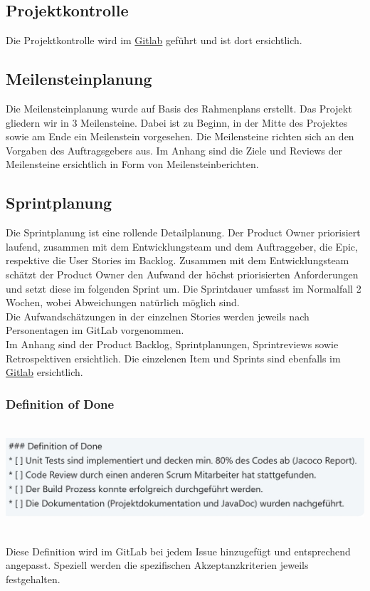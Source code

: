 \documentclass[11pt]{article}
\begin{document}
\subsection{Projektkontrolle}
Die Projektkontrolle wird im  \href{https://gitlab.enterpriselab.ch/vsk-20fs01/g04/g04-project/boards}{Gitlab} geführt und ist dort ersichtlich.

\subsection{Meilensteinplanung}
Die Meilensteinplanung wurde auf Basis des Rahmenplans erstellt. Das Projekt gliedern wir in 3 Meilensteine. Dabei ist zu Beginn, in der Mitte des Projektes sowie am Ende ein Meilenstein vorgesehen. Die Meilensteine richten sich an den Vorgaben des Auftragsgebers aus. Im Anhang sind die Ziele und Reviews der Meilensteine ersichtlich in Form von Meilensteinberichten. 
\subsection{Sprintplanung}
Die Sprintplanung ist eine rollende Detailplanung. Der Product Owner priorisiert laufend, zusammen mit dem Entwicklungsteam und dem Auftraggeber, die Epic, respektive die User Stories im Backlog. Zusammen mit dem Entwicklungsteam schätzt der Product Owner den Aufwand der höchst priorisierten Anforderungen und setzt diese im folgenden Sprint um. Die Sprintdauer umfasst im Normalfall 2 Wochen, wobei Abweichungen natürlich möglich sind. \\ 
Die Aufwandschätzungen in der einzelnen Stories werden jeweils nach Personentagen im GitLab vorgenommen. \\
Im Anhang sind der Product Backlog, Sprintplanungen, Sprintreviews sowie Retrospektiven ersichtlich. Die einzelenen Item und Sprints sind ebenfalls im  \href{https://gitlab.enterpriselab.ch/vsk-20fs01/g04/g04-project/boards}{Gitlab} ersichtlich. 

\subsubsection{Definition of Done}
\begin{center}
	\includegraphics[height=4cm,keepaspectratio]{images/Dod.JPG}
\end{center}
Diese Definition wird im GitLab bei jedem Issue hinzugefügt und entsprechend angepasst. Speziell werden die spezifischen Akzeptanzkriterien jeweils festgehalten.
\end{document}
